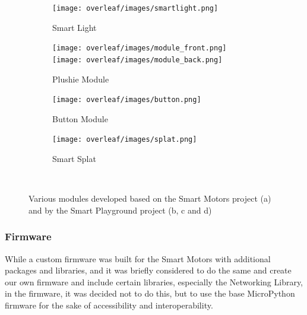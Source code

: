 \begin{figure}[H]
    \centering
    \begin{subfigure}[b]{0.19\textwidth}
        \texttt{[image: overleaf/images/smartlight.png]}
        \caption{Smart Light}
    \end{subfigure}
    \begin{subfigure}[b]{0.38\textwidth}
        \texttt{[image: overleaf/images/module\_front.png]}
        \texttt{[image: overleaf/images/module\_back.png]}
        \caption{Plushie Module}
    \end{subfigure}
    \begin{subfigure}[b]{0.19\textwidth}
        \texttt{[image: overleaf/images/button.png]}
        \caption{Button Module}
    \end{subfigure}
    \begin{subfigure}[b]{0.19\textwidth}
        \texttt{[image: overleaf/images/splat.png]}
        \caption{Smart Splat}
    \end{subfigure}
    \\\vspace{\ftspace}
     \caption{Various modules developed based on the Smart Motors project \citep{jess_smart_2025} (a) and by the Smart Playground project \citep{jess_smart_2025} (b, c and d)}
    \label{fig:hardware_examples}
\end{figure}

\subsubsection{\label{sec:methods_fw}Firmware}
While a custom firmware was built for the Smart Motors with additional packages and libraries, and it was briefly considered to do the same and create our own firmware and include certain libraries, especially the Networking Library, in the firmware, it was decided not to do this, but to use the base MicroPython firmware for the sake of accessibility and interoperability.


